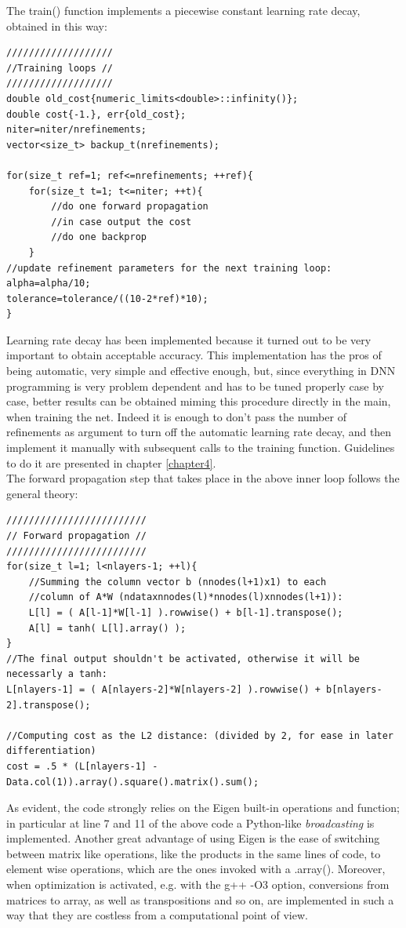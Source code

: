 \documentclass[12pt, a4paper]{report}
\theoremstyle{definition}
\begin{document}
The {\ttfamily train()} function implements a piecewise constant learning rate decay, obtained in this way:
\begin{lstlisting}[frame=single]
///////////////////
//Training loops //
///////////////////
double old_cost{numeric_limits<double>::infinity()};
double cost{-1.}, err{old_cost};
niter=niter/nrefinements;
vector<size_t> backup_t(nrefinements);
	
for(size_t ref=1; ref<=nrefinements; ++ref){
	for(size_t t=1; t<=niter; ++t){
		//do one forward propagation
		//in case output the cost
		//do one backprop
	}
//update refinement parameters for the next training loop:
alpha=alpha/10;
tolerance=tolerance/((10-2*ref)*10);
} 
\end{lstlisting} 
Learning rate decay has been implemented because it turned out to be very important to obtain acceptable accuracy. This implementation has the pros of being automatic, very simple and effective enough, but, since everything in DNN programming is very problem dependent and has to be tuned properly case by case, better results can be obtained miming this procedure directly in the main, when training the net. Indeed it is enough to don't pass the number of refinements as argument to turn off the automatic learning rate decay, and then implement it manually with subsequent calls to the training function. Guidelines to do it are presented in chapter \ref{chapter4}.\\
The forward propagation step that takes place in the above inner loop follows the general theory:
\begin{lstlisting}[frame=single]
/////////////////////////
// Forward propagation //
/////////////////////////
for(size_t l=1; l<nlayers-1; ++l){
	//Summing the column vector b (nnodes(l+1)x1) to each 
	//column of A*W (ndataxnnodes(l)*nnodes(l)xnnodes(l+1)):
	L[l] = ( A[l-1]*W[l-1] ).rowwise() + b[l-1].transpose();
	A[l] = tanh( L[l].array() );
}	
//The final output shouldn't be activated, otherwise it will be necessarly a tanh:
L[nlayers-1] = ( A[nlayers-2]*W[nlayers-2] ).rowwise() + b[nlayers-2].transpose();
	
//Computing cost as the L2 distance: (divided by 2, for ease in later differentiation)
cost = .5 * (L[nlayers-1] - Data.col(1)).array().square().matrix().sum();
\end{lstlisting}
As evident, the code strongly relies on the Eigen built-in operations and function; in particular at line 7 and 11 of the above code a Python-like \textit{broadcasting} is implemented. Another great advantage of using Eigen is the ease of switching between matrix like operations, like the products in the same lines of code, to element wise operations, which are the ones invoked with a {\ttfamily .array()}. Moreover, when optimization is activated, e.g. with the {\ttfamily g++ -O3} option, conversions from matrices to array, as well as transpositions and so on, are implemented in such a way that they are costless from a computational point of view.\\
\end{document}
